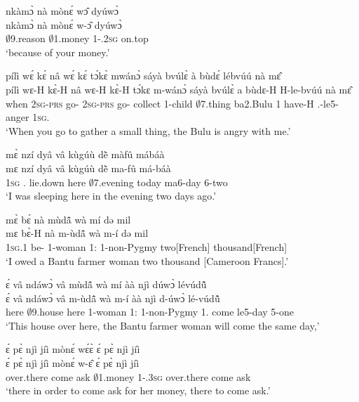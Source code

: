 \begin{exe}[(C234)]
\exC\label{112}
  \glll  nkàmɔ̀ nà mònɛ́ wɔ̂ dyúwɔ̀ \\
        nkàmɔ̀ nà mònɛ́ w-ɔ̂ dyúwɔ̀ \\
         $\emptyset$9.reason {\COM} $\emptyset$1.money 1-{\POSS}.2\textsc{sg} on.top  \\
    \trans `because of your money.'
 
\exC\label{113} 
  \glll pílì wɛ́ kɛ́ nâ wɛ́ kɛ́ tɔ́kɛ̀ mwánɔ̀ sáyà bvúlɛ̀ à bùdɛ́ lébvúú nà mɛ̂ \\
        pílì wɛ-H kɛ̀-H nâ wɛ-H kɛ̀-H tɔ́kɛ m-wánɔ̀ sáyà bvúlɛ̀ a bùdɛ-H H-le-bvúú nà mɛ̂ \\
           when 2\textsc{sg}-\textsc{prs} go-{\R} {\COMP} 2\textsc{sg}-\textsc{prs} go-{\R} collect {\N}1-child $\emptyset$7.thing ba2.Bulu 1 have-H {\OBJ}.{\LINK}-le5-anger {\COM} 1\textsc{sg}.{\OBJ} \\
    \trans `When you go to gather a small thing, the Bulu is angry with me.'
 
\exC\label{114} 
  \glll  mɛ̀ nzí dyâ vâ kùgúù dẽ̀ màfû mábáà \\
     mɛ nzí dyâ vâ kùgúù dẽ̀ ma-fû má-báà \\
          1\textsc{sg} {\PROG}.{\PST}  lie.down here $\emptyset$7.evening today ma6-day 6-two  \\
    \trans `I was sleeping here in the evening two days ago.'
 
\exC\label{115}
  \glll  mɛ̀ bɛ́ nà mùdã̂ wà mí də mil\\
        mɛ bɛ̀-H nà m-ùdã̂ wà m-í də  mil\\
          1\textsc{sg}.{\PST}1 be-{\R} {\COM} {\N}1-woman  1:{\ATT}  {\N}1-non-Pygmy two[French] thousand[French]\\
    \trans `I owed a Bantu farmer woman two thousand [Cameroon Francs].'
 
\exC\label{116}
  \glll ɛ́ vâ ndáwɔ̀ vâ mùdã̂ wà mí àà njì dúwɔ̀ lévúdũ̂ \\
       ɛ́ vâ ndáwɔ̀ vâ m-ùdã̂ wà m-í àà njì d-úwɔ̀ lé-vúdũ̂ \\
          {\LOC} here $\emptyset$9.house here {\N}1-woman 1:{\ATT}  {\N}1-non-Pygmy 1.{\FUT} come le5-day 5-one \\
    \trans `This house over here, the Bantu farmer woman will come the same day,'
 
\exC\label{117}
  \glll  ɛ́ pɛ̀ njì jíì mònɛ́ wɛ́ɛ̀ ɛ́ pɛ̀ njì jíì\\
         ɛ́ pɛ̀ njì jíì mònɛ́ w-ɛ̂ ɛ́ pɛ̀ njì jíì\\
        {\LOC} over.there come ask $\emptyset$1.money 1-{\POSS}.3\textsc{sg} {\LOC} over.there come ask\\
    \trans `there in order to come ask for her money, there to come ask.'
 

\end{exe}
